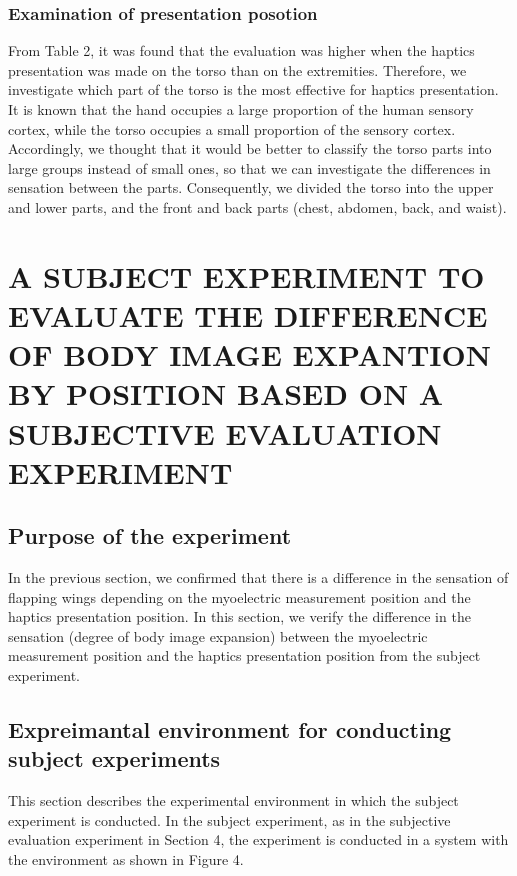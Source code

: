\documentclass[letterpaper, 10 pt, conference]{ieeeconf}  %
\begin{document}
                \subsubsection{Examination of presentation posotion}
                        From Table 2, it was found that the evaluation was higher when the haptics presentation was made on the torso than on the extremities. 
                        Therefore, we investigate which part of the torso is the most effective for haptics presentation. 
                        It is known that the hand occupies a large proportion of the human sensory cortex, while the torso occupies a small proportion of the sensory cortex\cite{penfield1950cerebral}. 
                        Accordingly, we thought that it would be better to classify the torso parts into large groups instead of small ones, so that we can investigate the differences in sensation between the parts. 
                        Consequently, we divided the torso into the upper and lower parts, and the front and back parts (chest, abdomen, back, and waist).        



\section{A SUBJECT EXPERIMENT TO EVALUATE THE DIFFERENCE OF BODY IMAGE EXPANTION BY POSITION BASED ON A SUBJECTIVE EVALUATION EXPERIMENT}

        \subsection{Purpose of the experiment}
                In the previous section, we confirmed that there is a difference in the sensation of flapping wings depending on the myoelectric measurement position and the haptics presentation position.  
                In this section, we verify the difference in the sensation (degree of body image expansion) between the myoelectric measurement position and the haptics presentation position from the subject experiment.  

        \subsection{Expreimantal environment for conducting subject experiments}
                This section describes the experimental environment in which the subject experiment is conducted.  
                In the subject experiment, as in the subjective evaluation experiment in Section 4, the experiment is conducted in a system with the environment as shown in Figure 4.  
\end{document}
